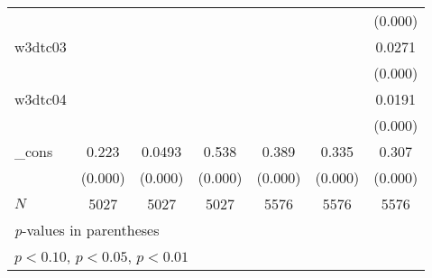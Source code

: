 {\begin{tabular}{l*{6}{c}}
            &                     &                     &                     &                     &                     &     (0.000)         \\
[1em]
w3dtc03     &                     &                     &                     &                     &                     &      0.0271\sym{***}\\
            &                     &                     &                     &                     &                     &     (0.000)         \\
[1em]
w3dtc04     &                     &                     &                     &                     &                     &      0.0191\sym{***}\\
            &                     &                     &                     &                     &                     &     (0.000)         \\
[1em]
\_cons      &       0.223\sym{***}&      0.0493\sym{***}&       0.538\sym{***}&       0.389\sym{***}&       0.335\sym{***}&       0.307\sym{***}\\
            &     (0.000)         &     (0.000)         &     (0.000)         &     (0.000)         &     (0.000)         &     (0.000)         \\
\hline
\(N\)       &        5027         &        5027         &        5027         &        5576         &        5576         &        5576         \\
\hline\hline
\multicolumn{7}{l}{\footnotesize \textit{p}-values in parentheses}\\
\multicolumn{7}{l}{\footnotesize \sym{*} \(p<0.10\), \sym{**} \(p<0.05\), \sym{***} \(p<0.01\)}\\
\end{tabular}
}
